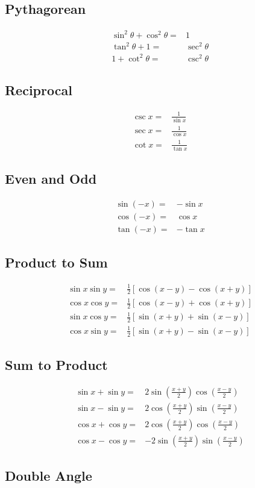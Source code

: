 \documentclass[12pt]{article}
\begin{document}
\begin{multicols}{2}
  \subsection*{Pythagorean}
  \begin{align*}
    & \sin^{2}\theta + \cos^{2}\theta = & 1 \\
    & \tan^{2}\theta + 1 = & \sec^{2}\theta \\
    & 1 + \cot^{2}\theta = & \csc^{2}\theta
  \end{align*}
  \subsection*{Reciprocal}
  \begin{align*}
    & \csc x = & \frac{1}{\sin x} \\
    & \sec x = & \frac{1}{\cos x} \\
    & \cot x = & \frac{1}{\tan x}
  \end{align*}
  \subsection*{Even and Odd}
  \begin{align*}
    & \sin(-x) = & -\sin x \\
    & \cos(-x) = & \cos x \\
    & \tan(-x) = & -\tan x
  \end{align*}
  \subsection*{Product to Sum}
  \begin{align*}
    & \sin x \sin y = & \frac{1}{2}[\cos(x-y) - \cos(x+y)] \\
    & \cos x \cos y = & \frac{1}{2}[\cos(x-y) + \cos(x+y)] \\
    & \sin x \cos y = & \frac{1}{2}[\sin(x+y) + \sin(x-y)] \\
    & \cos x \sin y = & \frac{1}{2}[\sin(x+y) - \sin(x-y)]
  \end{align*}
  \subsection*{Sum to Product}
  \begin{align*}
    & \sin x + \sin y = & 2\sin\left(\frac{x+y}{2}\right)\cos\left(\frac{x-y}{2}\right) \\
    & \sin x - \sin y = & 2\cos\left(\frac{x+y}{2}\right)\sin\left(\frac{x-y}{2}\right) \\
    & \cos x + \cos y = & 2\cos\left(\frac{x+y}{2}\right)\cos\left(\frac{x-y}{2}\right) \\
    & \cos x - \cos y = & -2\sin\left(\frac{x+y}{2}\right)\sin\left(\frac{x-y}{2}\right)
  \end{align*}
  \subsection*{Double Angle}
\end{multicols}
\end{document}

